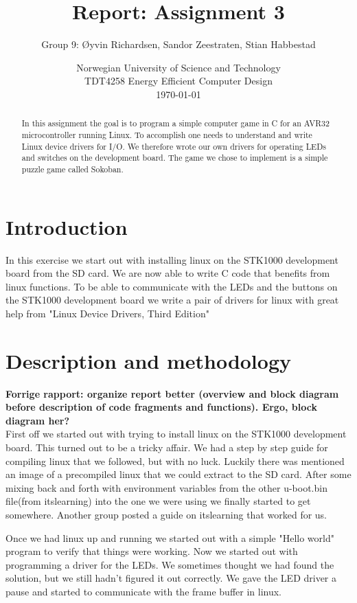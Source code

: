 \documentclass[a4paper,11pt]{article}
\title{\textbf{Report: Assignment 3}}
\author{Group 9: \O yvin Richardsen, Sandor Zeestraten, Stian Habbestad}
\date{{Norwegian University of Science and Technology \\
TDT4258 Energy Efficient Computer Design \\}
\today}
\begin{document}
\maketitle

\begin{abstract}
In this assignment the goal is to program a simple computer game in C for an AVR32 microcontroller running Linux. To accomplish one needs to understand and write Linux device drivers for I/O. We therefore wrote our own drivers for operating LEDs and switches on the development board. The game we chose to implement is a simple puzzle game called Sokoban.
\end{abstract}

\bigskip
\tableofcontents
\newpage

\section{Introduction}
In this exercise we start out with installing linux on the STK1000 development board from the SD card. We are now able to write C code that benefits from linux functions. %
To be able to communicate with the LEDs and the buttons on the STK1000 development board we write a pair of drivers for linux with great help from "Linux Device Drivers, Third Edition" \cite{ldd}


\section{Description and methodology}

\textbf{Forrige rapport: organize report better (overview and block diagram before description of code fragments and functions). Ergo, block diagram her?}\\

First off we started out with trying to install linux on the STK1000 development board. This turned out to be a tricky affair. We had a step by step guide for compiling linux that we followed, but with no luck. Luckily there was mentioned an image of a precompiled linux that we could extract to the SD card. After some mixing back and forth with environment variables from the other u-boot.bin file(from itslearning) into the one we were using we finally started to get somewhere. Another group posted a guide on itslearning that worked for us.

Once we had linux up and running we started out with a simple "Hello world" program to verify that things were working. Now we started out with programming a driver for the LEDs. We sometimes thought we had found the solution, but we still hadn't figured it out correctly. We gave the LED driver a pause and started to communicate with the frame buffer in linux. 
\end{document}
